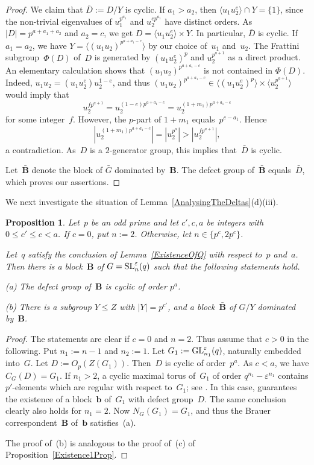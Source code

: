 \documentclass[12pt]{amsart}
\newcommand{\bB}{{\mathbf{B}}}
\newcommand{\bb}{{\mathbf{b}}}
\def\GL{ \text{\rm GL} }
\def\SL{ \text{\rm SL} }
\newtheorem{prop}[thm]{Proposition}
\theoremstyle{theorem}
\theoremstyle{definition}
\theoremstyle{remark}
\begin{document}
\begin{proof}
We claim that $\bar{D} := D/Y$ is
cyclic. If $a_1 > a_2$, then $\langle u_1u_2^{e} \rangle \cap Y = \{ 1 \}$, 
since the non-trivial eigenvalues of $u_1^{p^{a_1}}$ and $u_2^{ep^{a_1}}$ have 
distinct orders. As $|D| = p^{a+a_1+a_2}$ and $a_2 = c$, we get 
$D = \langle u_1u_2^{e} \rangle \times Y$. In particular, $\bar{D}$ is cyclic.
If $a_1 = a_2$, we have $Y = \langle (u_1u_2)^{p^{a+a_1-c}} \rangle$ by our
choice of~$u_1$ and~$u_2$. The Frattini subgroup~$\Phi(D)$ of~$D$ is generated 
by $(u_1u_2^{e})^p$ and $u_2^{p^{a+1}}$ as a direct product. An elementary
calculation shows that $(u_1u_2)^{p^{a+a_1-c}}$ is not contained in $\Phi( D )$.
Indeed, $u_1u_2 = (u_1u_2^e)u_2^{1-e}$, and thus $(u_1u_2)^{p^{a+a_1-c}} \in 
\langle (u_1u_2^{e})^p \rangle \times \langle u_2^{p^{a+1}} \rangle$ would imply 
that $$u_2^{fp^{a+1}} = u_2^{(1-e)p^{a+a_1-c}} = u_2^{(1+m_1)p^{a+a_1-c}}$$
for some integer~$f$. However, the $p$-part of $1 + m_1$ equals~$p^{c - a_1}$.
Hence 
$$|u_2^{(1+m_1)p^{a+a_1-c}}| = |u_2^{p^a}| > |u_2^{fp^{a+1}}|,$$
a contradiction.
As~$D$ is a $2$-generator group, this implies that~$\bar{D}$ is cyclic.

Let~$\bar{\bB}$ denote 
the block of $\bar{G}$ dominated by~$\bB$. The defect group
of~$\bar{\bB}$ equals~$\bar{D}$, which proves our assertions.
\end{proof}

We next investigate the situation of Lemma~\ref{AnalysingTheDeltas}(d)(iii).
\begin{prop}
\label{Existence2PropB}
Let~$p$ be an odd prime and let $c', c, a$ be integers with 
$0 \leq c' \leq c < a$. If $c = 0$, put $n := 2$. Otherwise, let
$n \in \{ p^c, 2p^c \}$. 

Let~$q$ satisfy the conclusion of {\rm Lemma~\ref{ExistenceOfQ}} with respect
to~$p$ and~$a$.  Then there is a block~$\bB$ of $G = \SL^\varepsilon_n( q )$ 
such that the following statements hold.

{\rm (a)} The defect group of~$\bB$ is cyclic of order $p^{a}$.

{\rm (b)} There is a subgroup $Y \leq Z$ with $|Y| = p^{c'}$, and a
block~$\bar{\bB}$ of $G/Y$ dominated by~${\bB}$.
\end{prop}
\begin{proof}
The statements are clear if $c = 0$ and $n = 2$. Thus assume that $c > 0$ in the
following. Put $n_1 := n - 1$ and $n_2 := 1$. Let 
$G_1 := \GL_{n_1}^\varepsilon( q )$, naturally embedded into~$G$. Let 
$D := O_p( Z( G_1 ) )$. Then~$D$ is cyclic of order~$p^a$. As $c < a$, we have 
$C_G(D) = G_1$. If $n_1 > 2$, a cyclic maximal torus of~$G_1$ of order 
$q^{n_1} - \varepsilon^{n_1}$ contains $p'$-elements which are regular with 
respect to~$G_1$; see \cite[Lemma~$3.6.3$]{HL25}.
In this case, \cite[Lemma~$2.5.16$]{HL25}
guarantees the existence of a block~$\bb$ 
of~$G_1$ with defect group~$D$. The same conclusion clearly also holds for 
$n_1 = 2$. Now $N_G(G_1) = G_1$, and thus the Brauer correspondent~$\bB$ 
of~$\bb$ satisfies~(a).

The proof of~(b) is analogous to the proof of~(c) of 
Proposition~\ref{Existence1Prop}.
\end{proof}
\end{document}
